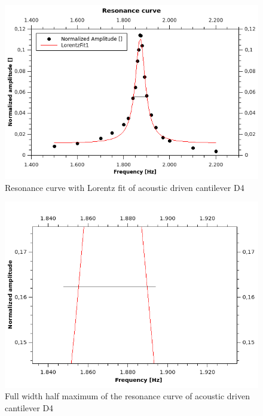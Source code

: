\documentclass[12pt,a4paper]{article}
\begin{document}
\begin{figure}[H]
	\centering
	\includegraphics[scale=0.8]{../figures/Resonanzkurve.png}
	\caption{Resonance curve with Lorentz fit of acoustic driven cantilever D4}
	\label{fig:resonanzkurve}
\end{figure}

\begin{figure}[H]
	\centering
	\includegraphics[scale=0.8]{../figures/ResonanzkurveHalbwertsbreite.png}
	\caption{Full width half maximum of the resonance curve of acoustic driven cantilever D4}
	\label{fig:resonanzkurvehmfuw}
\end{figure}
\end{document}
